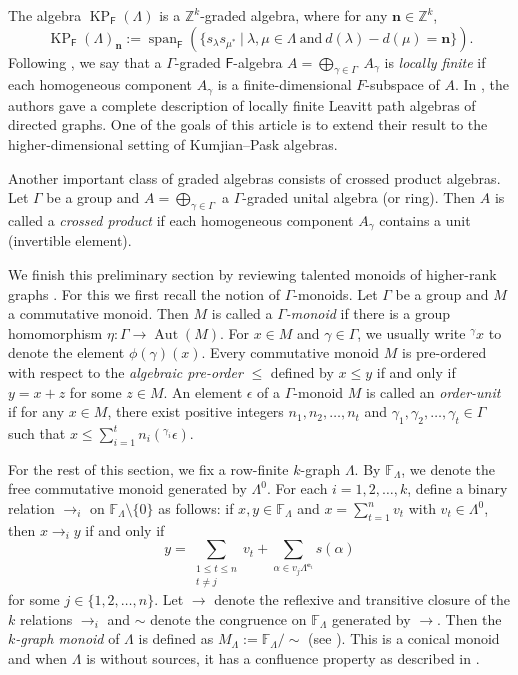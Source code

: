 \documentclass[a4paper,reqno,12pt]{amsart}
\numberwithin{equation}{section}
\theoremstyle{definition}
\theoremstyle{remark}
\newcommand{\Aut}{\operatorname{Aut}}
\newcommand{\lspan}{\operatorname{span}}
\newcommand{\KP}{\operatorname{KP}}
\newcommand{\N}{\mathbf{n}}
\begin{document}
The algebra $\KP_\mathsf{F}(\Lambda)$ is a $\mathbb{Z}^k$-graded algebra, where for any $\N\in \mathbb{Z}^k$, \[\KP_\mathsf{F}(\Lambda)_\N:=\lspan_\mathsf{F}\left(\{s_\lambda s_{\mu^*}~|~\lambda,\mu\in \Lambda~\text{and}~d(\lambda)-d(\mu)=\N\}\right).\] Following \cite{AAS}, we say that a $\Gamma$-graded $\mathsf{F}$-algebra $A=\displaystyle{\bigoplus_{\gamma\in \Gamma}}~A_\gamma$ is \emph{locally finite} if each homogeneous component $A_\gamma$ is a finite-dimensional $F$-subspace of $A$. In \cite{AAS}, the authors gave a complete description of locally finite Leavitt path algebras of directed graphs. One of the goals of this article is to extend their result to the higher-dimensional setting of Kumjian--Pask algebras. 

Another important class of graded algebras consists of crossed product algebras. Let $\Gamma$ be a group and $A=\displaystyle{\bigoplus_{\gamma\in \Gamma}}$ a $\Gamma$-graded unital algebra (or ring). Then $A$ is called a \emph{crossed product} if each homogeneous component $A_\gamma$ contains a unit (invertible element).  



We finish this preliminary section by reviewing talented monoids of higher-rank graphs \cite{HMPS1}. For this we first recall the notion of $\Gamma$-monoids. Let $\Gamma$ be a group and $M$ a commutative monoid. Then $M$ is called a \emph{$\Gamma$-monoid} if there is a group homomorphism $\eta:\Gamma\longrightarrow \Aut(M)$. For $x\in M$ and $\gamma\in \Gamma$, we usually write $^\gamma x$ to denote the element $\phi(\gamma)(x)$. Every commutative monoid $M$ is pre-ordered with respect to the \emph{algebraic pre-order} $\le$ defined by $x\le y$ if and only if $y=x+z$ for some $z\in M$. An element $\epsilon$ of a $\Gamma$-monoid $M$ is called an \emph{order-unit} if for any $x\in M$, there exist positive integers $n_1,n_2,\ldots,n_t$ and $\gamma_1,\gamma_2,\ldots,\gamma_t\in \Gamma$ such that $x\le \displaystyle{\sum_{i=1}^{t}} n_i(^{\gamma_i}\epsilon)$.

For the rest of this section, we fix a row-finite $k$-graph $\Lambda$. By $\mathbb{F}_\Lambda$, we denote the free commutative monoid generated by $\Lambda^0$. For each $i=1,2,\ldots,k$, define a binary relation $\longrightarrow_{i}$ on $\mathbb{F}_\Lambda\setminus \{0\}$ as follows: if $x,y\in \mathbb{F}_\Lambda$ and $x=\displaystyle{\sum_{t=1}^{n}} v_t$ with $v_t\in \Lambda^0$, then $x\longrightarrow_i y$ if and only if \[y=\displaystyle{\sum_{\substack{1\le t\le n\\t\neq j}}} v_t+\displaystyle{\sum_{\alpha\in v_j\Lambda^{\mathbf{e}_i}}}s(\alpha)\] for some $j\in \{1,2,\ldots,n\}$. Let $\longrightarrow$ denote the reflexive and transitive closure of the $k$ relations $\longrightarrow_i$ and $\sim$ denote the congruence on $\mathbb{F}_\Lambda$ generated by $\longrightarrow$. Then the \emph{$k$-graph monoid} of $\Lambda$ is defined as $M_\Lambda:=\mathbb{F}_\Lambda/\sim$ (see \cite{HMPS1}). This is a conical monoid and when $\Lambda$ is without sources, it has a confluence property as described in \cite[Lemma 3.5]{HMPS1}. 
\end{document}
